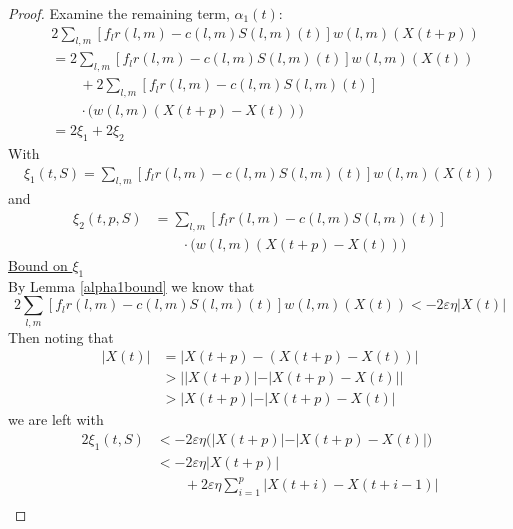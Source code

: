 \begin{proof}
Examine the remaining  term, $\alpha_1(t)$: %
\begin{align} \nonumber 
&2\sum_{l,m} [f_{l}  r(l,m) -  c(l,m)S(l,m)(t) ]  w(l,m)(X(t + p))   \\ \nonumber
&=  2\sum_{l,m} [f_{l}r(l,m) - c(l,m)S(l,m)(t) ]w(l,m)(X(t) )  \\ \nonumber
& \qquad  + 2\sum_{l,m} [f_{l}r(l,m) - c(l,m)S(l,m)(t) ] \\ \nonumber 
&\qquad \cdot \big(w(l,m)(X(t + p ) - X(t))\big) \\ \nonumber
&= 2 \xi_{1} + 2 \xi_{2}
\label{2terms}
\end{align}
With
\begin{align} 
\xi_{1} (t,S) = \sum_{l,m} \left[f_{l}r(l,m) - c(l,m)S(l,m)(t) \right]w(l,m)(X(t) )
\end{align}
and
\begin{align}\nonumber
\xi_{2} (t,p,S) &= \sum_{l,m} \left[f_{l}r(l,m) - c(l,m)S(l,m)(t) \right]\\
&\qquad \cdot\big(w(l,m)(X(t + p ) - X(t))\big)
\end{align}
\underline{Bound on $\xi_{1}$} \\
By Lemma \ref{alpha1bound} we know that
\begin{equation*}
2\sum_{l,m} [f_{l}r(l,m) - c(l,m)S(l,m)(t) ]w(l,m)(X(t )) < -2\varepsilon \eta \vert X(t) \vert
\end{equation*}
Then noting that
\begin{align*}
\vert X(t) \vert &= \vert X(t + p) - (X(t + p) - X(t)) \vert \\
&> \big\vert \vert X(t + p) \vert - \vert  X(t + p) - X(t)   \vert  \big\vert \\
&>  \vert X(t + p) \vert - \vert  X(t + p) - X(t)   \vert  
\end{align*}
we are left with
\begin{align} \nonumber
2\xi_1 (t,S) &< -2\varepsilon \eta \big( \vert X(t + p) \vert -  \vert  X(t + p) - X(t)   \vert \big)\\ \nonumber
&< -2\varepsilon \eta   \vert X(t + p) \vert \\  \nonumber
&\qquad + 2\varepsilon \eta\sum_{i=1}^{p} \vert  X(t + i) - X(t + i - 1)   \vert  \\ 

\end{align}
\end{proof}
